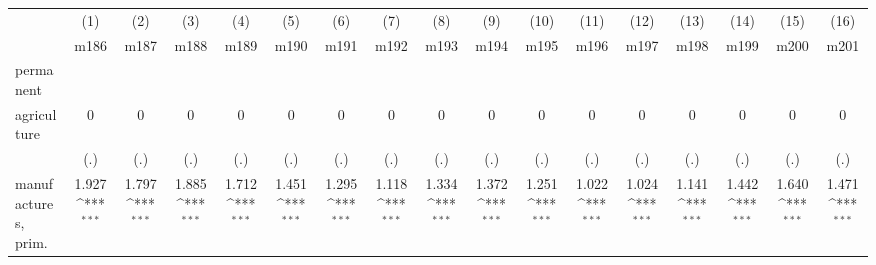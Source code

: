 {
\def\sym#1{\ifmmode^{#1}\else\(^{#1}\)\fi}
\begin{tabular}{l*{16}{c}}
\hline\hline
                    &\multicolumn{1}{c}{(1)}&\multicolumn{1}{c}{(2)}&\multicolumn{1}{c}{(3)}&\multicolumn{1}{c}{(4)}&\multicolumn{1}{c}{(5)}&\multicolumn{1}{c}{(6)}&\multicolumn{1}{c}{(7)}&\multicolumn{1}{c}{(8)}&\multicolumn{1}{c}{(9)}&\multicolumn{1}{c}{(10)}&\multicolumn{1}{c}{(11)}&\multicolumn{1}{c}{(12)}&\multicolumn{1}{c}{(13)}&\multicolumn{1}{c}{(14)}&\multicolumn{1}{c}{(15)}&\multicolumn{1}{c}{(16)}\\
                    &\multicolumn{1}{c}{m186}&\multicolumn{1}{c}{m187}&\multicolumn{1}{c}{m188}&\multicolumn{1}{c}{m189}&\multicolumn{1}{c}{m190}&\multicolumn{1}{c}{m191}&\multicolumn{1}{c}{m192}&\multicolumn{1}{c}{m193}&\multicolumn{1}{c}{m194}&\multicolumn{1}{c}{m195}&\multicolumn{1}{c}{m196}&\multicolumn{1}{c}{m197}&\multicolumn{1}{c}{m198}&\multicolumn{1}{c}{m199}&\multicolumn{1}{c}{m200}&\multicolumn{1}{c}{m201}\\
\hline
permanent           &                     &                     &                     &                     &                     &                     &                     &                     &                     &                     &                     &                     &                     &                     &                     &                     \\
agriculture         &           0         &           0         &           0         &           0         &           0         &           0         &           0         &           0         &           0         &           0         &           0         &           0         &           0         &           0         &           0         &           0         \\
                    &         (.)         &         (.)         &         (.)         &         (.)         &         (.)         &         (.)         &         (.)         &         (.)         &         (.)         &         (.)         &         (.)         &         (.)         &         (.)         &         (.)         &         (.)         &         (.)         \\
[1em]
manufactures, prim. &       1.927\sym{***}&       1.797\sym{***}&       1.885\sym{***}&       1.712\sym{***}&       1.451\sym{***}&       1.295\sym{***}&       1.118\sym{***}&       1.334\sym{***}&       1.372\sym{***}&       1.251\sym{***}&       1.022\sym{***}&       1.024\sym{***}&       1.141\sym{***}&       1.442\sym{***}&       1.640\sym{***}&       1.471\sym{***}\\

\end{tabular}}
